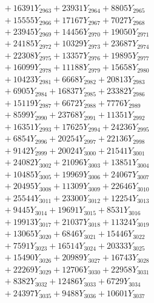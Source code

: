 \documentclass[a4paper,10pt]{article}
\begin{document}
{\begin{align}
&\;  + 16391 Y_{2963} + 23931 Y_{2964} + 8805 Y_{2965} \\[0.3ex]
&\;  + 15555 Y_{2966} + 17167 Y_{2967} + 7027 Y_{2968} \\[0.5ex]\allowbreak
&\;  + 23945 Y_{2969} + 14456 Y_{2970} + 19050 Y_{2971} \\[0.3ex]
&\;  + 24185 Y_{2972} + 10329 Y_{2973} + 23687 Y_{2974} \\[0.3ex]
&\;  + 22308 Y_{2975} + 13357 Y_{2976} + 19895 Y_{2977} \\[0.3ex]
&\;  + 16099 Y_{2978} + 11188 Y_{2979} + 15658 Y_{2980} \\[0.3ex]
&\;  + 10423 Y_{2981} + 6668 Y_{2982} + 20813 Y_{2983} \\[0.3ex]
&\;  + 6905 Y_{2984} + 16837 Y_{2985} + 23382 Y_{2986} \\[0.3ex]
&\;  + 15119 Y_{2987} + 6672 Y_{2988} + 7776 Y_{2989} \\[0.3ex]
&\;  + 8599 Y_{2990} + 23768 Y_{2991} + 11351 Y_{2992} \\[0.3ex]
&\;  + 16351 Y_{2993} + 17625 Y_{2994} + 24236 Y_{2995} \\[0.3ex]
&\;  + 6854 Y_{2996} + 20254 Y_{2997} + 22136 Y_{2998} \\[0.5ex]\allowbreak
&\;  + 9142 Y_{2999} + 20024 Y_{3000} + 21541 Y_{3001} \\[0.3ex]
&\;  + 24082 Y_{3002} + 21096 Y_{3003} + 13851 Y_{3004} \\[0.3ex]
&\;  + 10485 Y_{3005} + 19969 Y_{3006} + 24067 Y_{3007} \\[0.3ex]
&\;  + 20495 Y_{3008} + 11309 Y_{3009} + 22646 Y_{3010} \\[0.3ex]
&\;  + 25544 Y_{3011} + 23300 Y_{3012} + 12254 Y_{3013} \\[0.3ex]
&\;  + 9445 Y_{3014} + 19691 Y_{3015} + 8531 Y_{3016} \\[0.3ex]
&\;  + 19913 Y_{3017} + 21037 Y_{3018} + 11324 Y_{3019} \\[0.3ex]
&\;  + 13065 Y_{3020} + 6846 Y_{3021} + 15446 Y_{3022} \\[0.3ex]
&\;  + 7591 Y_{3023} + 16514 Y_{3024} + 20333 Y_{3025} \\[0.3ex]
&\;  + 15490 Y_{3026} + 20989 Y_{3027} + 16743 Y_{3028} \\[0.5ex]\allowbreak
&\;  + 22269 Y_{3029} + 12706 Y_{3030} + 22958 Y_{3031} \\[0.3ex]
&\;  + 8382 Y_{3032} + 12486 Y_{3033} + 6729 Y_{3034} \\[0.3ex]
&\;  + 24397 Y_{3035} + 9488 Y_{3036} + 10601 Y_{3037} \\[0.3ex]

\end{align}}
\end{document}
